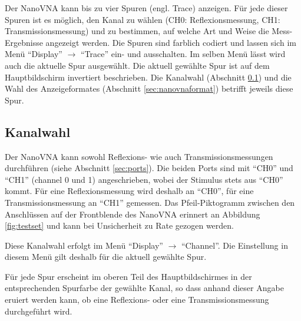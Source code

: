 \documentclass[twoside,a4paper,11pt,halfparskip,DIV=11,notitlepage]{scrartcl}
\begin{document}
Der NanoVNA kann bis zu vier Spuren (engl. Trace) anzeigen. Für jede dieser Spuren
ist es möglich, den Kanal zu wählen (CH0: Reflexionsmessung, CH1:
Transmissionsmessung) und zu bestimmen, auf welche Art und Weise die Mess-Ergebnisse
angezeigt werden. Die Spuren sind farblich codiert und lassen sich im Menü
``Display'' $\longrightarrow$ ``Trace'' ein- und ausschalten. Im selben Menü
lässt wird auch die aktuelle Spur ausgewählt. Die aktuell gewählte Spur ist auf dem
Hauptbildschirm invertiert beschrieben. Die Kanalwahl (Abschnitt
\ref{sec:nanovnachannel}) und die Wahl des Anzeigeformates (Abschnitt \ref{sec:nanovnaformat})
betrifft jeweils diese Spur.

\subsection{Kanalwahl}\label{sec:nanovnachannel}
\begin{center}\end{center}


Der NanoVNA kann sowohl Reflexions- wie auch Transmissionsmessungen durchführen
(siehe Abschnitt \ref{sec:ports}). Die beiden Ports sind mit ``CH0'' und ``CH1''
(channel 0 und 1) angeschrieben, wobei der Stimulus stets aus ``CH0'' kommt.
Für eine Reflexionsmessung wird deshalb an ``CH0'', für eine Transmissionsmessung
an ``CH1'' gemessen. Das Pfeil-Piktogramm zwischen den Anschlüssen auf der
Frontblende des NanoVNA erinnert an Abbildung \ref{fig:testset}
und kann bei Unsicherheit zu Rate gezogen werden.

Diese Kanalwahl erfolgt im Menü ``Display'' $\longrightarrow$ ``Channel''.
Die Einstellung in diesem Menü gilt deshalb für die aktuell gewählte Spur.

Für jede Spur erscheint im oberen Teil des Hauptbildschirmes in der
entsprechenden Spurfarbe der gewählte Kanal, so dass anhand dieser Angabe
eruiert werden kann, ob eine Reflexions- oder eine Transmissionsmessung
durchgeführt wird.
\end{document}
